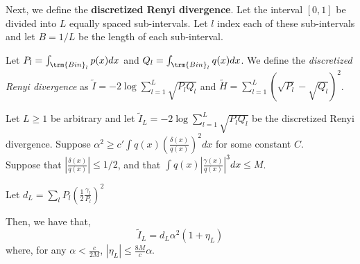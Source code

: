 \documentclass{article}
\begin{document}
Next, we define the \textbf{discretized Renyi divergence}. Let the interval $[0,1]$ be divided into $L$ equally spaced sub-intervals. Let $l$ index each of these sub-intervals and let $B = 1/L$ be the length of each sub-interval.

Let $P_l = \int_{\trm{Bin}_l} p(x) dx$ and $Q_l = \int_{\trm{Bin}_l} q(x)dx$. We define the \emph{discretized Renyi divergence} as $\tilde{I} = -2 \log \sum_{l=1}^L \sqrt{P_l Q_l} $ and $\tilde{H} = \sum_{l=1}^L (\sqrt{P_l} - \sqrt{Q_l})^2$. 


\begin{proposition}
\label{prop:discrete_renyi_order}
Let $L \geq 1$ be arbitrary and let $\tilde{I}_L = -2 \log \sum_{l=1}^L \sqrt{P_l Q_l}$ be the discretized Renyi divergence. Suppose $\alpha^2 \geq c' \int q(x) \left( \frac{\delta(x)}{q(x)} \right)^2 dx$ for some constant $C$. \\

Suppose that $\left| \frac{\delta(x)}{q(x)} \right| \leq 1/2$, and that $\int q(x) \left| \frac{\gamma(x)}{q(x)} \right|^3 dx \leq M$. 

Let $d_L = \sum_l P_l \left( \frac{1}{2} \frac{\gamma_l}{P_l} \right)^2 $

Then, we have that,
\[
 \tilde{I}_L = d_L \alpha^2 ( 1 + \eta_L )
\]
where, for any $\alpha < \frac{c}{2M}$, $|\eta_L| \leq \frac{8M}{c} \alpha$.

\end{proposition}
\end{document}
